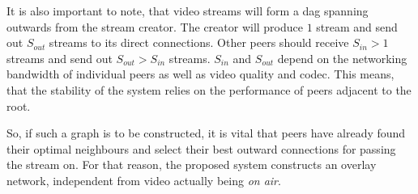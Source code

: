 It is also important to note, that video streams will form a \gls{dag} spanning outwards from the stream creator. The creator will produce $1$ stream and send out $S_{out}$ streams to its direct connections. Other peers should receive $S_{in} > 1$ streams and send out $S_{out} > S_{in}$ streams. $S_{in}$ and $S_{out}$ depend on the networking bandwidth of individual peers as well as video quality and codec. This means, that the stability of the system relies on the performance of peers adjacent to the root.

So, if such a graph is to be constructed, it is vital that peers have already found their optimal neighbours and select their best outward connections for passing the stream on. For that reason, the proposed system constructs an overlay network, independent from video actually being \textit{on air}.
